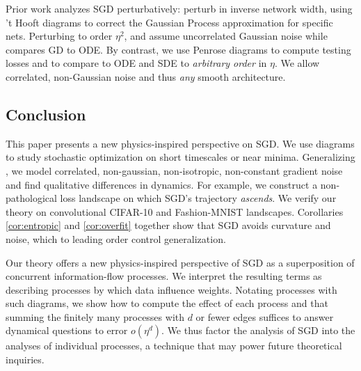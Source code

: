         
            Prior work analyzes SGD perturbatively: \cite{dy19} perturb in
            inverse network width, using 't Hooft diagrams to correct the
            Gaussian Process approximation for specific nets.  Perturbing
            to order $\eta^2$, \cite{ch18} and \cite{li17} assume uncorrelated
            Gaussian noise while \cite{ba21} compares GD to ODE.
            By contrast, we use Penrose diagrams \cite{pe71} to compute
            testing losses and to compare to ODE and SDE to \emph{arbitrary
            order} in $\eta$.  
            We allow correlated,
            non-Gaussian noise and thus \emph{any} smooth architecture.


\subsection{Conclusion}


            This paper presents a new physics-inspired perspective on SGD.  We
            use diagrams to study stochastic optimization on short timescales
            or near minima. 
Generalizing \cite{li18,we19b,zh19,ba21}, we model correlated, non-gaussian,
non-isotropic, non-constant gradient noise and find qualitative differences in
dynamics.  For example, we construct a non-pathological loss landscape on which
SGD's trajectory \emph{ascends}.  We verify our theory on convolutional
CIFAR-10 and Fashion-MNIST landscapes.
            Corollaries \ref{cor:entropic} and
            \ref{cor:overfit} together show that SGD avoids curvature and
            noise, which to leading order control generalization.


Our theory offers a new physics-inspired perspective of SGD as a
superposition of concurrent information-flow processes.  
    We interpret the resulting terms as describing processes  
by which data influence
weights.  
Notating processes with such diagrams, we show
how to compute the effect of each process and that summing the finitely many
processes with $d$ or fewer edges suffices to answer dynamical questions to
error $o(\eta^d)$.  We thus factor the analysis of SGD into the analyses of
individual processes, a technique that may power future theoretical inquiries.  



